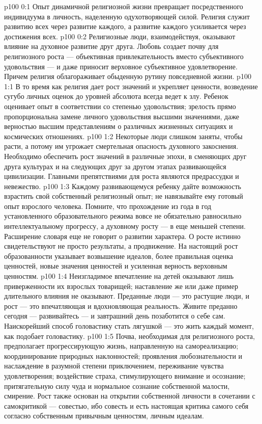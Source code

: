 \author{Мелхиседек}
\vs p100 0:1 Опыт динамичной религиозной жизни превращает посредственного индивидуума в личность, наделенную одухотворяющей силой. Религия служит развитию всех через развитие каждого, а развитие каждого усиливается через достижения всех.
\vs p100 0:2 Религиозные люди, взаимодействуя, оказывают влияние на духовное развитие друг друга. Любовь создает почву для религиозного роста --- объективная привлекательность вместо субъективного удовольствия --- и даже приносит верховное субъективное удовлетворение. Причем религия облагораживает обыденную рутину повседневной жизни.
\vs p100 1:1 В то время как религия дает рост значений и укрепляет ценности, возведение сугубо личных оценок до уровней абсолюта всегда ведет к злу. Ребенок оценивает опыт в соответствии со степенью удовольствия; зрелость прямо пропорциональна замене личного удовольствия высшими значениями, даже верностью высшим представлениям о различных жизненных ситуациях и космических отношениях.
\vs p100 1:2 Некоторые люди слишком заняты, чтобы расти, а потому им угрожает смертельная опасность духовного закоснения. Необходимо обеспечить рост значений в различные эпохи, в сменяющих друг друга культурах и на следующих друг за другом этапах развивающейся цивилизации. Главными препятствиями для роста являются предрассудки и невежество.
\vs p100 1:3 Каждому развивающемуся ребенку дайте возможность взрастить свой собственный религиозный опыт; не навязывайте ему готовый опыт взрослого человека. Помните, что прохождение из года в год установленного образовательного режима вовсе не обязательно равносильно интеллектуальному прогрессу, а духовному росту --- в еще меньшей степени. Расширение словаря еще не говорит о развитии характера. О росте истинно свидетельствуют не просто результаты, а продвижение. На настоящий рост образованности указывает возвышение идеалов, более правильная оценка ценностей, новые значения ценностей и усиленная верность верховным ценностям.
\vs p100 1:4 Неизгладимое впечатление на детей оказывают лишь приверженности их взрослых товарищей; наставление же или даже пример длительного влияния не оказывают. Преданные люди --- это растущие люди, и рост --- это впечатляющая и вдохновляющая реальность. Живите преданно сегодня --- развивайтесь --- и завтрашний день позаботится о себе сам. Наискорейший способ головастику стать лягушкой --- это жить каждый момент, как подобает головастику.
\vs p100 1:5 \pc Почва, необходимая для религиозного роста, предполагает прогрессирующую жизнь, направленную на самореализацию; координирование природных наклонностей; проявления любознательности и наслаждение в разумной степени приключением, переживание чувства удовлетворения; воздействие страха, стимулирующего внимание и осознание; притягательную силу чуда и нормальное сознание собственной малости, смирение. Рост также основан на открытии собственной личности в сочетании с самокритикой --- совестью, ибо совесть и есть настоящая критика самого себя согласно собственным привычным ценностям, личным идеалам.
